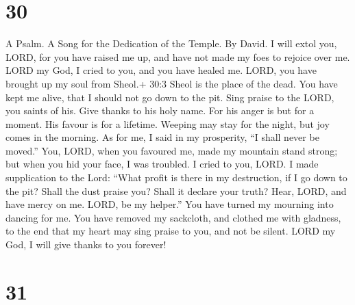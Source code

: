 \hypertarget{section-29}{%
\section{30}\label{section-29}}

A Psalm. A Song for the Dedication of the Temple. By David. 
I will extol you, LORD, for you have raised me up, and have not made my
foes to rejoice over me.  LORD my God, I cried to you, and
you have healed me.  LORD, you have brought up my soul from
Sheol.+ 30:3 Sheol is the place of the dead. You have kept me alive,
that I should not go down to the pit.  Sing praise to the
LORD, you saints of his. Give thanks to his holy name.  For
his anger is but for a moment. His favour is for a lifetime. Weeping may
stay for the night, but joy comes in the morning.  As for
me, I said in my prosperity, ``I shall never be moved.'' 
You, LORD, when you favoured me, made my mountain stand strong; but when
you hid your face, I was troubled.  I cried to you, LORD. I
made supplication to the Lord:  ``What profit is there in my
destruction, if I go down to the pit? Shall the dust praise you? Shall
it declare your truth?  Hear, LORD, and have mercy on me.
LORD, be my helper.''  You have turned my mourning into
dancing for me. You have removed my sackcloth, and clothed me with
gladness,  to the end that my heart may sing praise to you,
and not be silent. LORD my God, I will give thanks to you forever!

\hypertarget{section-30}{%
\section{31}\label{section-30}}

